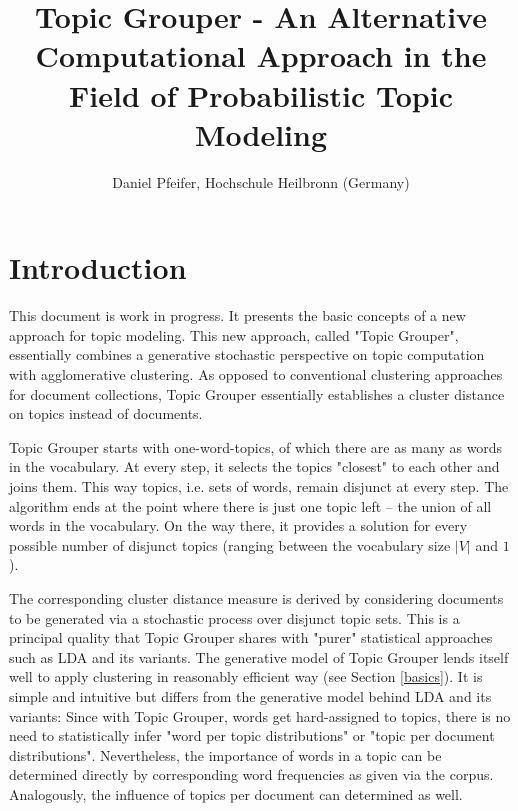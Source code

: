 \documentclass[10pt, a4paper, oneside]{article}
\begin{document}
\title{Topic Grouper - An Alternative Computational Approach in the Field of Probabilistic Topic Modeling}
\author{Daniel Pfeifer, Hochschule Heilbronn (Germany)}
\maketitle

\section{Introduction}

This document is work in progress. It presents the basic concepts of a new approach for topic modeling. This new approach, called "Topic Grouper", essentially combines a generative stochastic perspective on topic computation with agglomerative clustering.
As opposed to conventional clustering approaches for document collections, Topic Grouper essentially establishes a cluster distance on topics instead of documents. 

Topic Grouper starts with one-word-topics, of which there are as many as words in the vocabulary. At every step, it selects the topics "closest" to each other and joins them. This way topics, i.e. sets of words, remain disjunct at every step. The algorithm ends at the point where there is just one topic left -- the union of all words in the vocabulary.
On the way there, it provides a solution for every possible number of disjunct topics (ranging between the vocabulary size $|V|$ and $1$).

The corresponding cluster distance measure is derived by considering documents to be generated via a stochastic process over disjunct topic sets. This is a principal quality that Topic Grouper shares with "purer" statistical approaches such as LDA \cite{Blei:2003:LDA:944919.944937} and its variants.
The generative model of Topic Grouper lends itself well to apply clustering in reasonably efficient way (see Section \ref{basics}). It is simple and intuitive but differs from the generative model behind LDA and its variants: Since with Topic Grouper, words get hard-assigned to topics, there is no need to statistically infer "word per topic distributions" or "topic per document distributions". Nevertheless, the importance of words in a topic can be determined directly by corresponding word frequencies as given via the corpus. Analogously, the influence of topics per document can determined as well.
\end{document}
